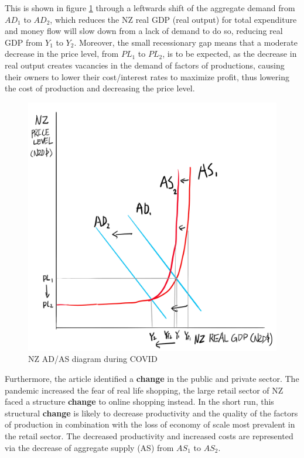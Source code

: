 \documentclass[a4paper,12pt]{article}
\begin{document}
This is shown in figure \ref{fig:asad} through a leftwards shift of the aggregate demand from $AD_1$ to $AD_2$, which reduces the NZ real GDP (real output) for total expenditure and money flow will slow down from a lack of demand to do so, reducing real GDP from $Y_1$ to $Y_2$. Moreover, the small recessionary gap means that a moderate decrease in the price level, from $PL_1$ to $PL_2$, is to be expected, as the decrease in real output creates vacancies in the demand of factors of productions, causing their owners to lower their cost/interest rates to maximize profit, thus lowering the cost of production and decreasing the price level.

\begin{figure}[H]
    \centering
    \includegraphics[scale=0.6]{assets/asad.png}
    \caption{NZ AD/AS diagram during COVID}
    \label{fig:asad}
\end{figure}

Furthermore, the article identified a \textbf{change} in the public and private sector. The pandemic increased the fear of real life shopping, the large retail sector of NZ faced a structure \textbf{change} to online shopping instead. In the short run, this structural \textbf{change} is likely to decrease productivity and the quality of the factors of production
in combination with the loss of economy of scale most prevalent in the retail sector. The decreased productivity and increased costs are represented via the decrease of aggregate supply (AS) from $AS_1$ to $AS_2$.
\end{document}
